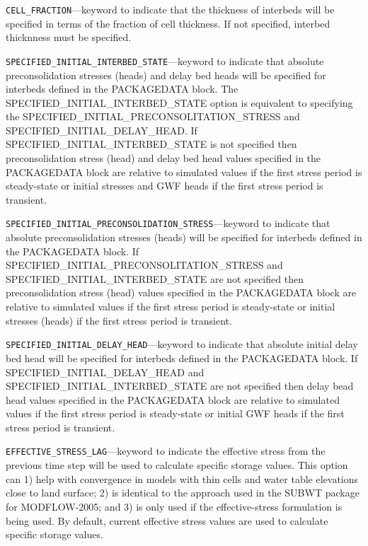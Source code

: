 \begin{description}
\item \texttt{CELL\_FRACTION}---keyword to indicate that the thickness of interbeds will be specified in terms of the fraction of cell thickness. If not specified, interbed thicknness must be specified.

\item \texttt{SPECIFIED\_INITIAL\_INTERBED\_STATE}---keyword to indicate that absolute preconsolidation stresses (heads) and delay bed heads will be specified for interbeds defined in the PACKAGEDATA block. The SPECIFIED\_INITIAL\_INTERBED\_STATE option is equivalent to specifying the SPECIFIED\_INITIAL\_PRECONSOLITATION\_STRESS and SPECIFIED\_INITIAL\_DELAY\_HEAD. If SPECIFIED\_INITIAL\_INTERBED\_STATE is not specified then preconsolidation stress (head) and delay bed head values specified in the PACKAGEDATA block are relative to simulated values if the first stress period is steady-state or initial stresses and GWF heads if the first stress period is transient.

\item \texttt{SPECIFIED\_INITIAL\_PRECONSOLIDATION\_STRESS}---keyword to indicate that absolute preconsolidation stresses (heads) will be specified for interbeds defined in the PACKAGEDATA block. If SPECIFIED\_INITIAL\_PRECONSOLITATION\_STRESS and SPECIFIED\_INITIAL\_INTERBED\_STATE are not specified then preconsolidation stress (head) values specified in the PACKAGEDATA block are relative to simulated values if the first stress period is steady-state or initial stresses (heads) if the first stress period is transient.

\item \texttt{SPECIFIED\_INITIAL\_DELAY\_HEAD}---keyword to indicate that absolute initial delay bed head will be specified for interbeds defined in the PACKAGEDATA block. If SPECIFIED\_INITIAL\_DELAY\_HEAD and SPECIFIED\_INITIAL\_INTERBED\_STATE are not specified then delay bead head values specified in the PACKAGEDATA block are relative to simulated values if the first stress period is steady-state or initial GWF heads if the first stress period is transient.

\item \texttt{EFFECTIVE\_STRESS\_LAG}---keyword to indicate the effective stress from the previous time step will be used to calculate specific storage values. This option can 1) help with convergence in models with thin cells and water table elevations close to land surface; 2) is identical to the approach used in the SUBWT package for MODFLOW-2005; and 3) is only used if the effective-stress formulation is being used. By default, current effective stress values are used to calculate specific storage values.


\end{description}
